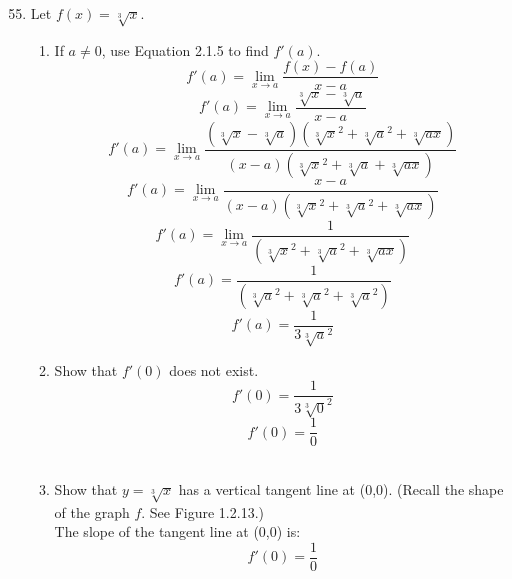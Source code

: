 \documentclass[12pt]{article}
\begin{document}
\begin{enumerate}
    \setcounter{enumi}{54}
    \item Let $f(x) = \sqrt[3]{x}$.
          \begin{enumerate}
              \item If $a \neq 0$, use Equation 2.1.5 to find $f'(a)$.
                    \[f'(a) = {\displaystyle \lim_{x \to a} \frac{f(x) - f(a)}{x-a}}\]
                    \[f'(a) = {\displaystyle \lim_{x \to a} \frac{\sqrt[3]{x} - \sqrt[3]{a}}{x-a}}\]
                    \[f'(a) = {\displaystyle \lim_{x \to a} \frac{(\sqrt[3]{x} - \sqrt[3]{a})(\sqrt[3]{x}^2 + \sqrt[3]{a}^2 + \sqrt[3]{ax})}{(x-a)(\sqrt[3]{x}^2 + \sqrt[3]{a} + \sqrt[3]{ax})}}\]
                    \[f'(a) = {\displaystyle \lim_{x \to a} \frac{x-a}{(x-a)(\sqrt[3]{x}^2 + \sqrt[3]{a}^2 + \sqrt[3]{ax})}}\]
                    \[f'(a) = {\displaystyle \lim_{x \to a} \frac{1}{(\sqrt[3]{x}^2 + \sqrt[3]{a}^2 + \sqrt[3]{ax})}}\]
                    \[f'(a) = {\displaystyle \frac{1}{(\sqrt[3]{a}^2 + \sqrt[3]{a}^2 + \sqrt[3]{a}^2)}}\]
                    \[\boxed{f'(a) = {\displaystyle \frac{1}{3\sqrt[3]{a}^2}}}\]
              \item Show that $f'(0)$ does not exist.
                    \[f'(0) = {\displaystyle \frac{1}{3\sqrt[3]{0}^2}}\]
                    \[f'(0) = {\displaystyle \frac{1}{0}}\]
                    \noindent{}\\
              \item Show that $y = \sqrt[3]{x}$ has a vertical tangent line at (0,0). (Recall the shape of the graph $f$. See Figure 1.2.13.)\\
                    The slope of the tangent line at (0,0) is:
                    \[f'(0) = {\displaystyle \frac{1}{0}}\]

                    \noindent{}\\
          \end{enumerate}
\end{enumerate}
\end{document}
